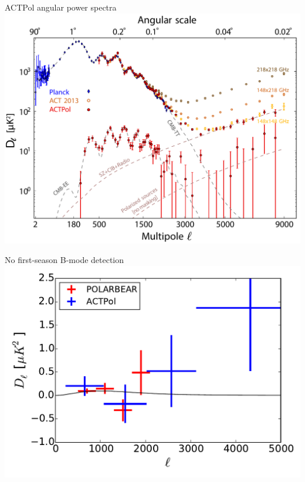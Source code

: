 \documentclass[table]{beamer}
\begin{document}
\begin{frame}{ACTPol angular power spectra}
	\centering
	\includegraphics[width=\textwidth]{tteepaper.pdf}
\end{frame}

\begin{frame}{No first-season B-mode detection}
	\centering
	\includegraphics[width=\textwidth]{actpol_bb_lin.pdf}
\end{frame}
\end{document}
